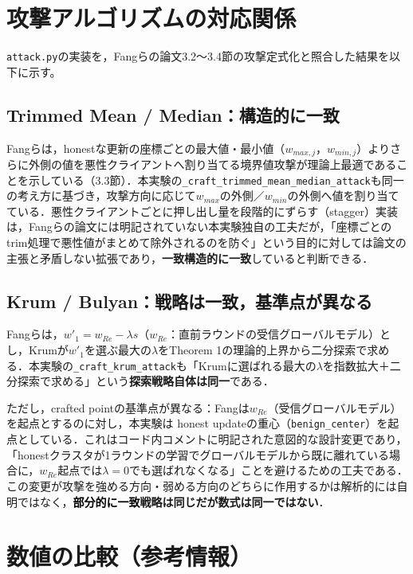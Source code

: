 \documentclass[a4j, twocolumn, dvipdfmx]{jsarticle}
\newcommand{\okmark}{\textcolor{okgreen}{\textbf{一致}}}
\newcommand{\halfmark}{\textcolor{black}{\textbf{部分的に一致}}}
\begin{document}
\section{攻撃アルゴリズムの対応関係}

\texttt{attack.py}の実装を，Fangらの論文3.2〜3.4節の攻撃定式化と照合した結果を以下に示す。

\subsection{Trimmed Mean / Median：構造的に一致}
Fangらは，honestな更新の座標ごとの最大値・最小値（$w_{max,j}$，$w_{min,j}$）よりさらに外側の値を悪性クライアントへ割り当てる境界値攻撃が理論上最適であることを示している（3.3節）．本実験の\texttt{\_craft\_trimmed\_mean\_median\_attack}も同一の考え方に基づき，攻撃方向に応じて$w_{max}$の外側／$w_{min}$の外側へ値を割り当てている．悪性クライアントごとに押し出し量を段階的にずらす（stagger）実装は，Fangらの論文には明記されていない本実験独自の工夫だが，「座標ごとのtrim処理で悪性値がまとめて除外されるのを防ぐ」という目的に対しては論文の主張と矛盾しない拡張であり，\okmark{}\textbf{構造的に一致}していると判断できる．

\subsection{Krum / Bulyan：戦略は一致，基準点が異なる}
Fangらは，$w'_1 = w_{Re} - \lambda s$（$w_{Re}$：直前ラウンドの受信グローバルモデル）とし，Krumが$w'_1$を選ぶ最大の$\lambda$をTheorem 1の理論的上界から二分探索で求める．本実験の\texttt{\_craft\_krum\_attack}も「Krumに選ばれる最大の$\lambda$を指数拡大＋二分探索で求める」という\textbf{探索戦略自体は同一}である．

ただし，crafted pointの基準点が異なる：Fangは$w_{Re}$（受信グローバルモデル）を起点とするのに対し，本実験は honest updateの重心（\texttt{benign\_center}）を起点としている．これはコード内コメントに明記された意図的な設計変更であり，「honestクラスタが1ラウンドの学習でグローバルモデルから既に離れている場合に，$w_{Re}$起点では$\lambda=0$でも選ばれなくなる」ことを避けるための工夫である．この変更が攻撃を強める方向・弱める方向のどちらに作用するかは解析的には自明ではなく，\halfmark{}\textbf{戦略は同じだが数式は同一ではない}．

\section{数値の比較（参考情報）}
\end{document}
